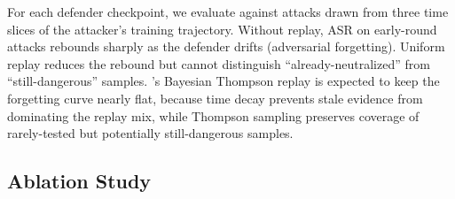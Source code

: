 For each defender checkpoint, we evaluate against attacks drawn from three time slices of the attacker's training trajectory. Without replay, ASR on early-round attacks rebounds sharply as the defender drifts (adversarial forgetting). Uniform replay reduces the rebound but cannot distinguish ``already-neutralized'' from ``still-dangerous'' samples. \method's Bayesian Thompson replay is expected to keep the forgetting curve nearly flat, because time decay prevents stale evidence from dominating the replay mix, while Thompson sampling preserves coverage of rarely-tested but potentially still-dangerous samples.

\subsection{Ablation Study}
\label{sec:exp-ablation}

